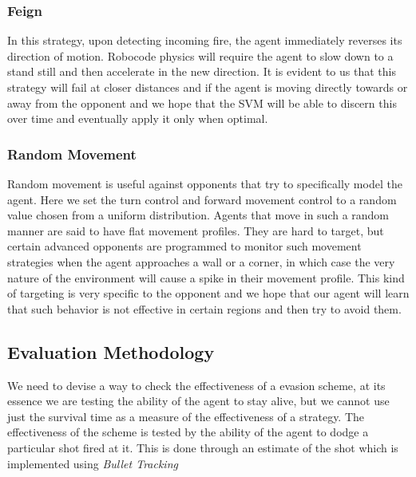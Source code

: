 \documentclass{article}
\theoremstyle{plain}
\theoremstyle{definition}
\theoremstyle{remark}
\begin{document}
\subsubsection*{Feign}
In this strategy, upon detecting incoming fire, the agent immediately reverses its direction of motion. Robocode physics will require the agent to slow down to a stand still and then accelerate in the new direction. It is evident to us that this strategy will fail at closer distances and if the agent is moving directly towards or away from the opponent and we hope that the SVM will be able to discern this over time and eventually apply it only when optimal.

\subsubsection*{Random Movement}
Random movement is useful against opponents that try to specifically model the agent. Here we set the turn control and forward movement control to a random value chosen from a uniform distribution. Agents that move in such a random manner are said to have flat movement profiles. They are hard to target, but certain advanced opponents are programmed to monitor such movement strategies when the agent approaches a wall or a corner, in which case the very nature of the environment will cause a spike in their movement profile. This kind of targeting is very specific to the opponent and we hope that our agent will learn that such behavior is not effective in certain regions and then try to avoid them.\\

\subsection*{Evaluation Methodology}
We need to devise a way to check the effectiveness of a evasion scheme, at its essence we are testing the ability of the agent to stay alive, but we cannot use just the survival time as a measure of the effectiveness of a strategy. The effectiveness of the scheme is tested by the ability of the agent to dodge a particular shot fired at it. This is done through an estimate of the shot which is implemented using \emph{Bullet Tracking}\\
\end{document}
